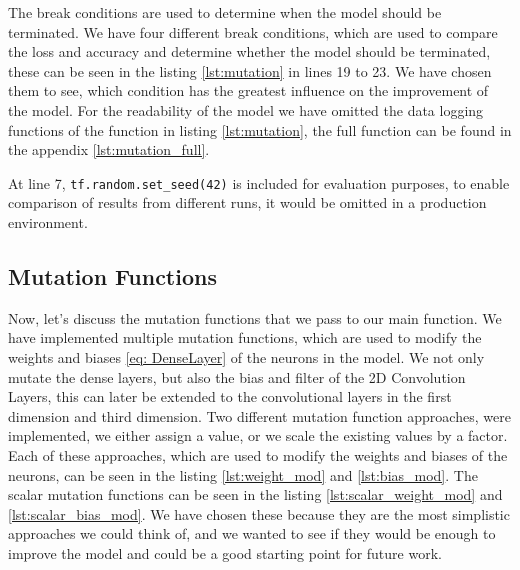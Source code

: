 The break conditions are used to determine when the model should be terminated.
We have four different break conditions, which are used to compare the loss and accuracy and determine whether the model should be terminated, these can be seen in the listing \ref{lst:mutation} in lines 19 to 23.
We have chosen them to see, which condition has the greatest influence on the improvement of the model.
For the readability of the model we have omitted the data logging functions of the function in listing \ref{lst:mutation}, the full function can be found in the appendix \ref{lst:mutation_full}.

At line 7, \texttt{tf.random.set\_seed(42)} is included for evaluation purposes, to enable comparison of results from different runs, it would be omitted in a production environment.



\subsection{Mutation Functions}\label{subsec:mutation-functions}
Now, let's discuss the mutation functions that we pass to our main function.
We have implemented multiple mutation functions, which are used to modify the weights and biases \ref{eq: DenseLayer} of the neurons in the model.
We not only mutate the dense layers, but also the bias and filter of the 2D Convolution Layers, this can later be extended to the convolutional layers in the first dimension and third dimension.
Two different mutation function approaches, were implemented, we either assign a value, or we scale the existing values by a factor.
Each of these approaches, which are used to modify the weights and biases of the neurons, can be seen in the listing \ref{lst:weight_mod} and \ref{lst:bias_mod}.
The scalar mutation functions can be seen in the listing \ref{lst:scalar_weight_mod} and \ref{lst:scalar_bias_mod}.
We have chosen these because they are the most simplistic approaches we could think of, and we wanted to see if they would be enough to improve the model and could be a good starting point for future work.

